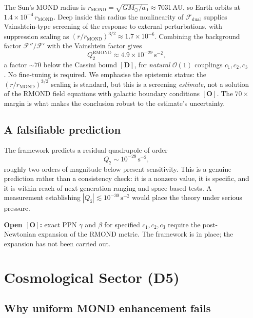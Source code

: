 \documentclass[aps,prd,preprint,superscriptaddress,nofootinbib,amsmath,amssymb,floatfix]{revtex4-2}
\begin{document}
The Sun's MOND radius is $r_{\text{MOND}} = \sqrt{GM_\odot/a_0} \approx 7031\,\text{AU}$, so Earth orbits at $1.4\times10^{-4}\,r_{\text{MOND}}$. Deep inside this radius the nonlinearity of $\mathcal{F}_{\text{dual}}$ supplies Vainshtein-type screening \cite{Vainshtein1972} of the response to external perturbations, with suppression scaling as $(r/r_{\text{MOND}})^{3/2} \approx 1.7\times10^{-6}$. Combining the background factor $\mathcal{F}''/\mathcal{F}'$ with the Vainshtein factor gives
\begin{equation}
Q_2^{\text{RMOND}} \approx 4.9\times10^{-29}\,\text{s}^{-2},
\end{equation}
a factor $\sim70$ below the Cassini bound $\mathbf{[D]}$, for \emph{natural} $\mathcal{O}(1)$ couplings $c_1,c_2,c_3$. No fine-tuning is required. We emphasise the epistemic status: the $(r/r_{\text{MOND}})^{3/2}$ scaling is standard, but this is a screening \emph{estimate}, not a solution of the RMOND field equations with galactic boundary conditions $\mathbf{[O]}$. The $70\times$ margin is what makes the conclusion robust to the estimate's uncertainty.

\subsection{A falsifiable prediction}

The framework predicts a residual quadrupole of order
\begin{equation}
\label{eq:q2pred}
Q_2 \sim 10^{-29}\,\text{s}^{-2},
\end{equation}
roughly two orders of magnitude below present sensitivity. This is a genuine prediction rather than a consistency check: it is a nonzero value, it is specific, and it is within reach of next-generation ranging and space-based tests. A measurement establishing $|Q_2| \lesssim 10^{-30}\,\text{s}^{-2}$ would place the theory under serious pressure.

\textbf{Open $\mathbf{[O]}$:} exact PPN $\gamma$ and $\beta$ for specified $c_1,c_2,c_3$ require the post-Newtonian expansion of the RMOND metric. The framework is in place; the expansion has not been carried out.

\section{Cosmological Sector (D5)}
\label{sec:cosmo}

\subsection{Why uniform MOND enhancement fails}
\end{document}
